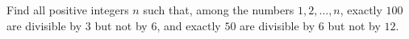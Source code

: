 Find all positive integers $n$ such that, among the numbers $1,2,\dots,n$, exactly $100$ are divisible by $3$ but not by $6$, and exactly $50$ are divisible by $6$ but not by $12$.
